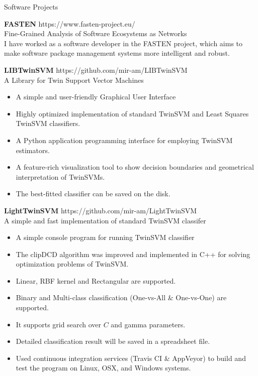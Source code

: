 \documentclass{resume} %
\begin{document}
\begin{rSection}{Software Projects}
	
	{\bf FASTEN} \hfill {https://www.fasten-project.eu/} \\ 
	Fine-Grained Analysis of Software Ecosystems as Networks \\
	
	I have worked as a software developer in the FASTEN project, which aims to make software package management systems more intelligent and robust.
	
	{\bf LIBTwinSVM} \hfill {https://github.com/mir-am/LIBTwinSVM} \\ 
	A Library for Twin Support Vector Machines \\
	
	\begin{itemize}
		\item A simple and user-friendly Graphical User Interface
		\item Highly optimized implementation of standard TwinSVM and Least Squares TwinSVM classifiers.
		\item A Python application programming interface for employing TwinSVM estimators.
		\item A feature-rich visualization tool to show decision boundaries and geometrical interpretation of TwinSVMs.
		\item The best-fitted classifier can be saved on the disk.
	\end{itemize}

	\newpage
	
	{\bf LightTwinSVM} \hfill { https://github.com/mir-am/LightTwinSVM} \\ 
	A simple and fast implementation of standard TwinSVM classifer  \\
	
	\begin{itemize}
	\item A simple console program for running TwinSVM classifier
	\item The clipDCD algorithm was improved and implemented in C++ for solving optimization problems of TwinSVM.
	\item Linear, RBF kernel and Rectangular are supported.
	\item Binary and Multi-class classification (One-vs-All \& One-vs-One) are supported.
	\item It supports grid search over $C$ and gamma parameters.
	\item Detailed classification result will be saved in a spreadsheet file.
	\item Used continuous integration services (Travis CI \& AppVeyor) to build and test the program on Linux, OSX, and Windows systems.
	\end{itemize}

\end{rSection}
\end{document}
